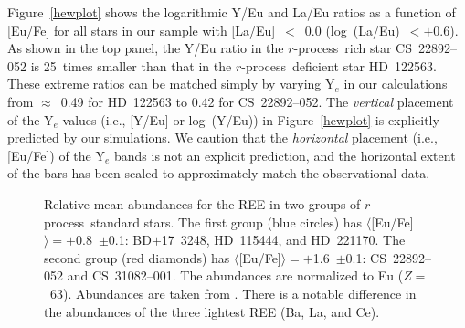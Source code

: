 \documentclass{emulateapj}
\def\rpro{\mbox{$r$-process}}
\begin{document}
Figure~\ref{hewplot} shows the logarithmic Y/Eu and La/Eu ratios
as a function of [Eu/Fe] for all stars in our sample with
[La/Eu]~$<$~0.0 (log~(La/Eu)~$< +$0.6).
As shown in the top panel, the Y/Eu ratio in the
\rpro\ rich star \mbox{CS~22892--052}
is 25~times smaller than that in the \rpro\ deficient star
\mbox{HD~122563}.
These extreme ratios can be matched simply by varying Y$_e$
in our calculations from $\approx$~0.49 for \mbox{HD~122563}
to 0.42 for \mbox{CS~22892--052}.
The \textit{vertical} placement of the Y$_e$ values 
(i.e., [Y/Eu] or log~(Y/Eu)) in Figure~\ref{hewplot} is explicitly predicted
by our simulations.
We caution that the \textit{horizontal} placement (i.e., [Eu/Fe])
of the Y$_e$ bands is not an explicit prediction, and the 
horizontal extent of the bars has been scaled to 
approximately match the observational data.

\begin{figure}
\begin{center}
\end{center}
\caption{
\label{sneden09plot}
Relative mean abundances for the REE
in two groups of \rpro\ standard stars.
The first group (blue circles) has $\langle$[Eu/Fe]$\rangle = +$0.8~$\pm$0.1:
\mbox{BD$+$17~3248}, \mbox{HD~115444}, and \mbox{HD~221170}.
The second group (red diamonds) has $\langle$[Eu/Fe]$\rangle = +$1.6~$\pm$0.1:
\mbox{CS~22892--052} and \mbox{CS~31082--001}.
The abundances are normalized to Eu ($Z =$~63).
Abundances are taken from \citet{sneden09}.
There is a notable difference in the abundances of the three
lightest REE (Ba, La, and Ce).
}
\end{figure}
\end{document}
